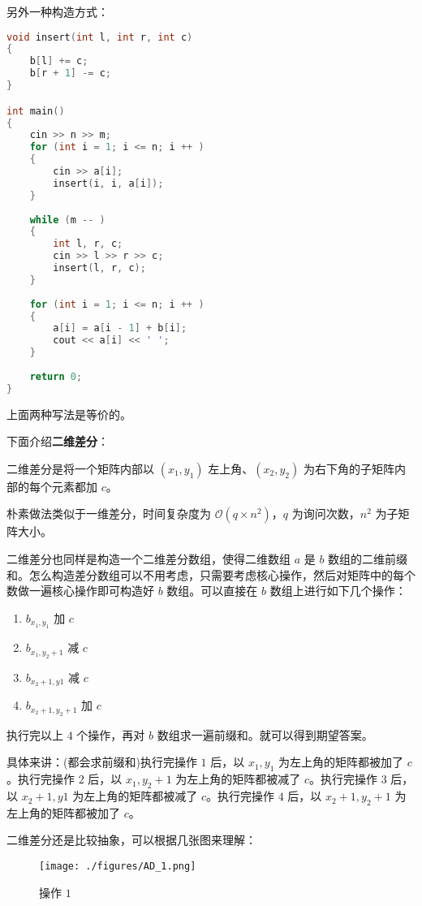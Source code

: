 另外一种构造方式：

\begin{lstlisting}[language=cpp]
void insert(int l, int r, int c)
{
    b[l] += c;
    b[r + 1] -= c;
}

int main()
{
    cin >> n >> m;
    for (int i = 1; i <= n; i ++ ) 
    {
        cin >> a[i];
        insert(i, i, a[i]);
    }
    
    while (m -- )
    {
        int l, r, c;
        cin >> l >> r >> c;
        insert(l, r, c);
    }
    
    for (int i = 1; i <= n; i ++ ) 
    {
        a[i] = a[i - 1] + b[i];
        cout << a[i] << ' ';
    }
    
    return 0;
}
\end{lstlisting}

上面两种写法是等价的。

下面介绍\textbf{二维差分}：

二维差分是将一个矩阵内部以 $(x_1, y_1)$ 左上角、$(x_2, y_2)$ 为右下角的子矩阵内部的每个元素都加 $c$。

朴素做法类似于一维差分，时间复杂度为 $\mathcal{O}(q \times n^2)$，$q$ 为询问次数，$n^2$ 为子矩阵大小。

二维差分也同样是构造一个二维差分数组，使得二维数组 $a$ 是 $b$ 数组的二维前缀和。怎么构造差分数组可以不用考虑，只需要考虑核心操作，然后对矩阵中的每个数做一遍核心操作即可构造好 $b$ 数组。可以直接在 $b$ 数组上进行如下几个操作：

\begin{enumerate}
\item $b_{x_1, y_1}$ 加 $c$
\item $b_{x_1, y_2 + 1}$ 减 $c$ 
\item $b_{x_2 + 1, y1}$ 减 $c$
\item $b_{x_2 + 1, y_2 + 1}$ 加 $c$
\end{enumerate}

执行完以上 $4$ 个操作，再对 $b$ 数组求一遍前缀和。就可以得到期望答案。 

具体来讲：(都会求前缀和)执行完操作 $1$ 后，以 $x_1, y_1$ 为左上角的矩阵都被加了 $c$。执行完操作 $2$ 后，以 $x_1, y_2 + 1$ 为左上角的矩阵都被减了 $c$。执行完操作 $3$ 后，以 $x_2 + 1, y1$ 为左上角的矩阵都被减了 $c$。执行完操作 $4$ 后，以 $x_2 + 1, y_2 + 1$ 为左上角的矩阵都被加了 $c$。

二维差分还是比较抽象，可以根据几张图来理解：

\begin{figure}[ht]
\centering
\texttt{[image: ./figures/AD\_1.png]}
\caption{操作 $1$} \label{AD_fig1}
\end{figure}

